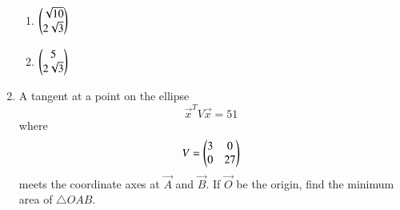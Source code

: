 \documentclass[journal,12pt,twocolumn]{IEEEtran}
\begin{document}
\begin{enumerate}[label=\arabic*.]
\begin{enumerate}
\item $\begin{pmatrix}\sqrt{10}  \\ 2\sqrt{3}\end{pmatrix}$
\item $\begin{pmatrix}5 \\ 2\sqrt{3}\end{pmatrix}$
\end{enumerate}
\item A tangent at a point on the ellipse 
\begin{equation}
\vec{x}^TV\vec{x} =51
\end{equation}
%
where
\begin{equation}
V = \begin{pmatrix}3 & 0 \\ 0 & 27\end{pmatrix}
\end{equation}
%
meets the coordinate axes at  $\vec{A}$  and  $\vec{B}$.  If   $\vec{O}$  be the origin, find the minimum area 
of $\triangle OAB$.
\end{enumerate}
\end{document}
